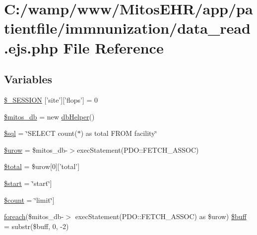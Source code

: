 \hypertarget{patientfile_2immnunization_2data__read_8ejs_8php}{\section{\-C\-:/wamp/www/\-Mitos\-E\-H\-R/app/patientfile/immnunization/data\-\_\-read.ejs.\-php \-File \-Reference}
\label{patientfile_2immnunization_2data__read_8ejs_8php}
}
\subsection*{\-Variables}
\begin{DoxyCompactItemize}
\item 
\hyperlink{patientfile_2immnunization_2data__read_8ejs_8php_a99fda8552a3e58235643b79f5af3ded8}{\$\-\_\-\-S\-E\-S\-S\-I\-O\-N} \mbox{[}'site'\mbox{]}\mbox{[}'flops'\mbox{]} = 0
\item 
\hyperlink{patientfile_2immnunization_2data__read_8ejs_8php_ab5d961f93efe4e2e8d8374f01dd6c65a}{\$mitos\-\_\-db} = new \hyperlink{classdb_helper}{db\-Helper}()
\item 
\hyperlink{patientfile_2immnunization_2data__read_8ejs_8php_a047170d6020a882807665812a27e2525}{\$sql} = \char`\"{}\-S\-E\-L\-E\-C\-T count($\ast$) as total \-F\-R\-O\-M facility\char`\"{}
\item 
\hyperlink{patientfile_2immnunization_2data__read_8ejs_8php_ad9c2d1ef7b3320949b2590ef6ab251bd}{\$urow} = \$mitos\-\_\-db-\/$>$exec\-Statement(\-P\-D\-O\-::\-F\-E\-T\-C\-H\-\_\-\-A\-S\-S\-O\-C)
\item 
\hyperlink{patientfile_2immnunization_2data__read_8ejs_8php_a241b818f48030b628685b2e5119c5624}{\$total} = \$urow\mbox{[}0\mbox{]}\mbox{[}'total'\mbox{]}
\item 
\hyperlink{patientfile_2immnunization_2data__read_8ejs_8php_a50a00e7de77365e00b117e73aa82fb9b}{\$start} = \char`\"{}start\char`\"{}\mbox{]}
\item 
\hyperlink{patientfile_2immnunization_2data__read_8ejs_8php_af789423037bbc89dc7c850e761177570}{\$count} = \char`\"{}limit\char`\"{}\mbox{]}
\item 
\hyperlink{php_thumb_8demo_8demo_8php_a9caa026f841c5a6057418795d37e0ef9}{foreach}(\$mitos\-\_\-db-\/$>$\*
exec\-Statement(\-P\-D\-O\-::\-F\-E\-T\-C\-H\-\_\-\-A\-S\-S\-O\-C) \*
as \$urow) \hyperlink{patientfile_2immnunization_2data__read_8ejs_8php_ac239e650f9aaeb483c9806c22cb4d492}{\$buff} = substr(\$buff, 0, -\/2)
\end{DoxyCompactItemize}


